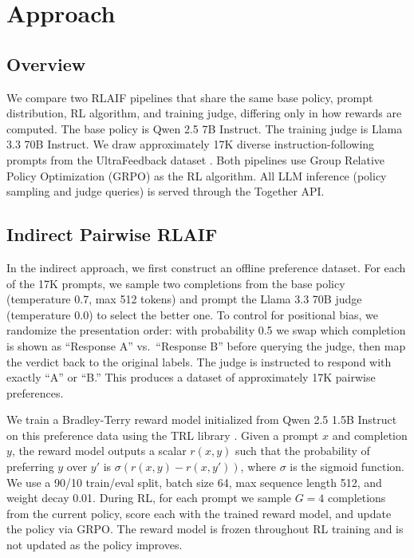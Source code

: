 \documentclass{article}
\begin{document}
\section{Approach}

\subsection{Overview}

We compare two RLAIF pipelines that share the same base policy, prompt distribution, RL algorithm, and training judge, differing only in how rewards are computed. The base policy is Qwen 2.5 7B Instruct. The training judge is Llama 3.3 70B Instruct. We draw approximately 17K diverse instruction-following prompts from the UltraFeedback dataset \citep{cui2023ultrafeedback}. Both pipelines use Group Relative Policy Optimization (GRPO) \citep{shao2024deepseekmath} as the RL algorithm. All LLM inference (policy sampling and judge queries) is served through the Together API.

\subsection{Indirect Pairwise RLAIF}

In the indirect approach, we first construct an offline preference dataset. For each of the 17K prompts, we sample two completions from the base policy (temperature 0.7, max 512 tokens) and prompt the Llama 3.3 70B judge (temperature 0.0) to select the better one. To control for positional bias, we randomize the presentation order: with probability 0.5 we swap which completion is shown as ``Response A'' vs.\ ``Response B'' before querying the judge, then map the verdict back to the original labels. The judge is instructed to respond with exactly ``A'' or ``B.'' This produces a dataset of approximately 17K pairwise preferences.

We train a Bradley-Terry reward model initialized from Qwen 2.5 1.5B Instruct on this preference data using the TRL library \citep{vonwerra2020trl}. Given a prompt $x$ and completion $y$, the reward model outputs a scalar $r(x, y)$ such that the probability of preferring $y$ over $y'$ is $\sigma(r(x, y) - r(x, y'))$, where $\sigma$ is the sigmoid function. We use a 90/10 train/eval split, batch size 64, max sequence length 512, and weight decay 0.01. During RL, for each prompt we sample $G = 4$ completions from the current policy, score each with the trained reward model, and update the policy via GRPO. The reward model is frozen throughout RL training and is not updated as the policy improves.
\end{document}
